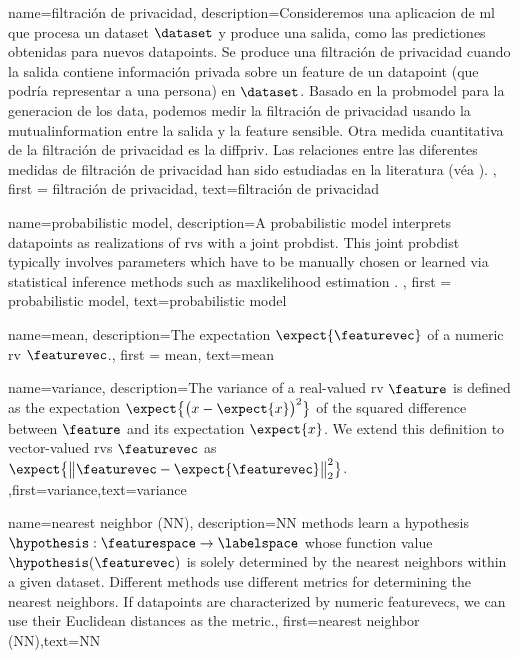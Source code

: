 {{
{
	name=filtración de privacidad,
	description={Consideremos una aplicacion de \gls{ml} que procesa un
	\gls{dataset} $\dataset$ y produce una salida, como las \gls{prediction}es 
	obtenidas para nuevos \gls{datapoint}s. Se produce una filtración de privacidad 
	cuando la salida contiene información privada sobre un \gls{feature} de un 
	\gls{datapoint} (que podría representar a una persona) en $\dataset$. Basado en la \gls{probmodel} 
	para la generacion de los \gls{data}, podemos medir la filtración de privacidad usando la \gls{mutualinformation} 
	entre la salida y la \gls{feature} sensible. Otra medida cuantitativa de la filtración de privacidad 
	es la \gls{diffpriv}. Las relaciones entre las diferentes medidas de filtración de privacidad han sido estudiadas en la literatura (véa \cite{InfThDiffPriv}). 
	}, 
	first = {filtración de privacidad}, text={filtración de privacidad} 
}



{
	name=probabilistic model,
	description={A probabilistic \gls{model} interprets \gls{datapoint}s 
		as \gls{realization}s of \gls{rv}s with a joint \gls{probdist}. This joint \gls{probdist} typically 
		involves \gls{parameters} which have to be manually chosen or learned via statistical inference 
		methods such as \gls{maxlikelihood} estimation \cite{LC}. }, 
	first = {probabilistic model}, text={probabilistic model} 
}



{
	name=mean,
	description={The \gls{expectation} $\expect \{ \featurevec \}$ of a numeric \gls{rv} $\featurevec$.}, 
		first = {mean}, text={mean} 
}

{
	name={variance},
	description={The variance of a real-valued \gls{rv} $\feature$ is defined as the \gls{expectation} 
		$\expect\big\{ \big( x - \expect\{x \} \big)^{2} \big\}$ of the squared difference between $\feature$ 
		and its \gls{expectation} $\expect\{x \}$. We extend this definition to vector-valued \gls{rv}s $\featurevec$ 
		as $\expect\big\{ \big\| \featurevec - \expect\{\featurevec \} \big\|_{2}^{2} \big\}$.} ,first={variance},text={variance} 
}

{
	name={nearest neighbor (NN)},
	description={NN methods learn a \gls{hypothesis} 
		$\hypothesis: \featurespace \rightarrow \labelspace$ whose function value $\hypothesis(\featurevec)$ 
		is solely determined by the nearest \gls{neighbors} within a given \gls{dataset}. Different 
		methods use different metrics for determining the nearest \gls{neighbors}. If \gls{datapoint}s 
		are characterized by numeric \gls{featurevec}s, we can use their Euclidean distances as 
		the metric.},
	first={nearest neighbor (NN)},text={NN} 
}

}}
